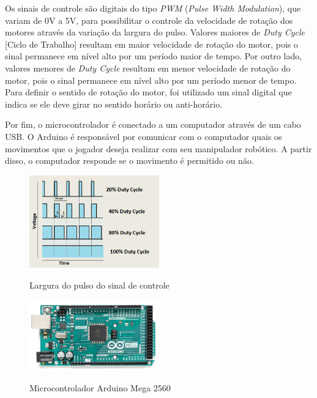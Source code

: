 Os sinais de controle são digitais do tipo \textit{PWM} (\textit{Pulse Width Modulation}), que variam de 0V a 5V, para possibilitar o controle da velocidade de rotação dos motores através da variação da largura do pulso.
Valores maiores de \textit{Duty Cycle} [Ciclo de Trabalho] resultam em maior velocidade de rotação do motor, pois o sinal permanece em nível alto por um período maior de tempo.
Por outro lado, valores menores de \textit{Duty Cycle} resultam em menor velocidade de rotação do motor, pois o sinal permanece em nível alto por um período menor de tempo.
Para definir o sentido de rotação do motor, foi utilizado um sinal digital que indica se ele deve girar no sentido horário ou anti-horário.

Por fim, o microcontrolador é conectado a um computador através de um cabo USB.
O Arduino é responsável por comunicar com o computador quais os movimentos que o jogador deseja realizar com seu manipulador robótico.
A partir disso, o computador responde se o movimento é permitido ou não.

\begin{figure}[H]
    \centering
    \caption{Largura do pulso do sinal de controle}
    \includegraphics[keepaspectratio=true, width=0.5\textwidth]
    	{img/pwm.png}
    \label{fig:pwm}
\end{figure}

\begin{figure}[H]
    \centering
    \caption{Microcontrolador Arduino Mega 2560}
    \includegraphics[keepaspectratio=true, width=0.5\textwidth]
    	{img/foto-arduino.png}
    \label{fig:fotoArduino}
\end{figure}

